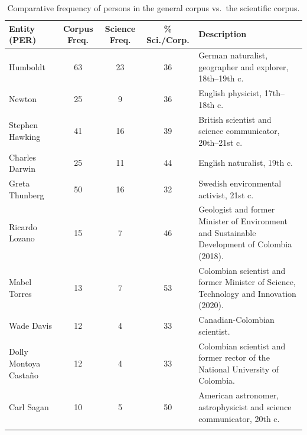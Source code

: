 \documentclass[pdflatex,sn-mathphys-num, iicol]{sn-jnl}
\begin{document}
	\begin{table}[h!]
		\caption{Comparative frequency of persons in the general corpus vs.\ the scientific corpus.}
		\label{tab:ents_per}
		{\footnotesize
			\begin{tabular}{@{}p{2.8cm}cccP{5cm}@{}}
				\toprule
				\textbf{Entity (PER)} & \textbf{Corpus Freq.} & \textbf{Science Freq.} & \textbf{\% Sci./Corp.} & \textbf{Description} \\
				\midrule
				Humboldt              & 63 & 23 & 36 & German naturalist, geographer and explorer, 18th--19th c. \\
				Newton                & 25 & 9  & 36 & English physicist, 17th--18th c. \\
				Stephen Hawking       & 41 & 16 & 39 & British scientist and science communicator, 20th--21st c. \\
				Charles Darwin        & 25 & 11 & 44 & English naturalist, 19th c. \\
				Greta Thunberg        & 50 & 16 & 32 & Swedish environmental activist, 21st c. \\
				Ricardo Lozano        & 15 & 7  & 46 & Geologist and former Minister of Environment and Sustainable Development of Colombia (2018). \\
				Mabel Torres          & 13 & 7  & 53 & Colombian scientist and former Minister of Science, Technology and Innovation (2020). \\
				Wade Davis            & 12 & 4  & 33 & Canadian-Colombian scientist. \\
				Dolly Montoya Casta{\~n}o & 12 & 4 & 33 & Colombian scientist and former rector of the National University of Colombia. \\
				Carl Sagan            & 10 & 5  & 50 & American astronomer, astrophysicist and science communicator, 20th c. \\
				\botrule
			\end{tabular}
		}
	\end{table}
	
\end{document}
